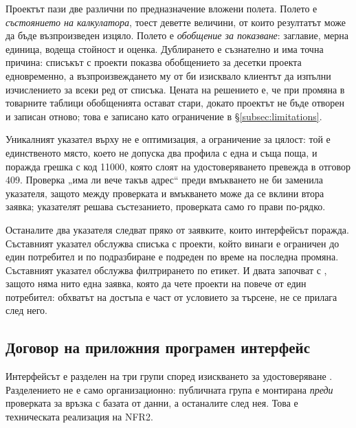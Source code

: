 Проектът пази две различни по предназначение вложени полета. Полето  е
\emph{състоянието на калкулатора}, тоест деветте величини, от които резултатът може да
бъде възпроизведен изцяло. Полето  е \emph{обобщение за показване}:
заглавие, мерна единица, водеща стойност и оценка. Дублирането е съзнателно и има
точна причина: списъкът с проекти показва обобщението за десетки проекта
едновременно, а възпроизвеждането му от  би изисквало клиентът да
изпълни изчислението за всеки ред от списъка. Цената на решението е, че при промяна
в товарните таблици обобщенията остават стари, докато проектът не бъде отворен и
записан отново; това е записано като ограничение в §\ref{subsec:limitations}.

Уникалният указател върху  не е оптимизация, а ограничение за цялост:
той е единственото място, което не допуска два профила с една и съща поща, и
поражда грешка с код 11000, която слоят на удостоверяването превежда в отговор 409.
Проверка „има ли вече такъв адрес“ преди вмъкването не би заменила указателя, защото
между проверката и вмъкването може да се вклини втора заявка; указателят решава
състезанието, проверката само го прави по-рядко.

Останалите два указателя следват пряко от заявките, които интерфейсът поражда.
Съставният указател  обслужва списъка с проекти, който
винаги е ограничен до един потребител и по подразбиране е подреден по време на
последна промяна. Съставният указател  обслужва филтрирането по
етикет. И двата започват с , защото няма нито една заявка, която да чете
проекти на повече от един потребител: обхватът на достъпа е част от условието за
търсене, не се прилага след него.

\subsection{Договор на приложния програмен интерфейс}
\label{subsec:api}

Интерфейсът е разделен на три групи според изискването за удостоверяване
. Разделението не е само организационно: публичната група е монтирана
\emph{преди} проверката за връзка с базата от данни, а останалите след нея. Това е
техническата реализация на NFR2.

